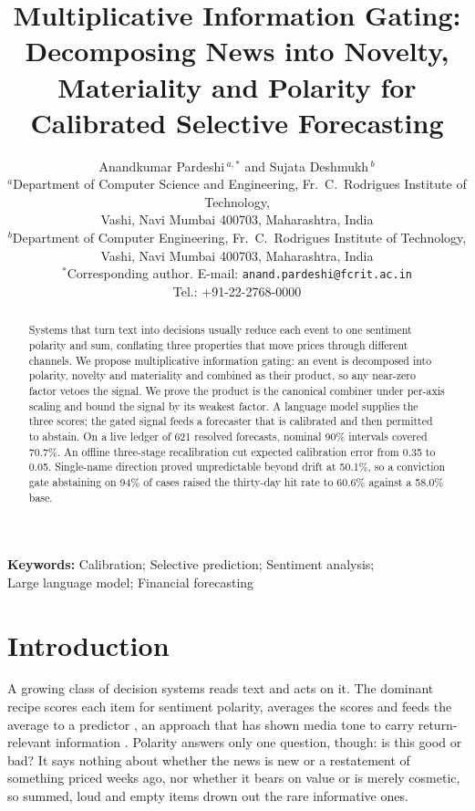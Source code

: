 \documentclass[12pt,a4paper]{article}
\title{\textbf{Multiplicative Information Gating: Decomposing News into Novelty,
Materiality and Polarity for Calibrated Selective Forecasting}}
\author{
Anandkumar Pardeshi\,$^{a,*}$ \quad and \quad Sujata Deshmukh\,$^{b}$\\[0.5em]
\small $^{a}$Department of Computer Science and Engineering,
Fr.\ C.\ Rodrigues Institute of Technology,\\
\small Vashi, Navi Mumbai 400703, Maharashtra, India\\[0.2em]
\small $^{b}$Department of Computer Engineering,
Fr.\ C.\ Rodrigues Institute of Technology,\\
\small Vashi, Navi Mumbai 400703, Maharashtra, India\\[0.3em]
\small $^{*}$Corresponding author. E-mail: \texttt{anand.pardeshi@fcrit.ac.in}\\
\small Tel.: +91-22-2768-0000
}
\date{}
\begin{document}
\maketitle

\RaggedRight
\setlength{\parindent}{1.27cm}
\setlength{\parskip}{0pt}
\doublespacing

\begin{abstract}
\normalsize\noindent
Systems that turn text into decisions usually reduce each event to one sentiment
polarity and sum, conflating three properties that move prices through different
channels. We propose multiplicative information gating: an event is decomposed
into polarity, novelty and materiality and combined as their product, so any
near-zero factor vetoes the signal. We prove the product is the canonical combiner
under per-axis scaling and bound the signal by its weakest factor. A language model
supplies the three scores; the gated signal feeds a forecaster that is calibrated
and then permitted to abstain. On a live ledger of 621 resolved forecasts, nominal
90\% intervals covered 70.7\%. An offline three-stage recalibration cut expected
calibration error from 0.35 to 0.05. Single-name direction proved unpredictable
beyond drift at 50.1\%, so a conviction gate abstaining on 94\% of cases raised the
thirty-day hit rate to 60.6\% against a 58.0\% base.
\end{abstract}

\noindent\textbf{Keywords:} Calibration; Selective prediction; Sentiment
analysis;\\ Large language model; Financial forecasting


\section{Introduction}

A growing class of decision systems reads text and acts on it. The dominant recipe
scores each item for sentiment polarity, averages the scores and feeds the average
to a predictor \cite{tetlock2007,loughran2011}, an approach that has shown media
tone to carry return-relevant information \cite{tetlock2007,antweiler2004}. Polarity
answers only one question, though: is this good or bad? It says nothing about
whether the news is new or a restatement of something priced weeks ago, nor whether
it bears on value or is merely cosmetic, so summed, loud and empty items drown out
the rare informative ones.
\end{document}
